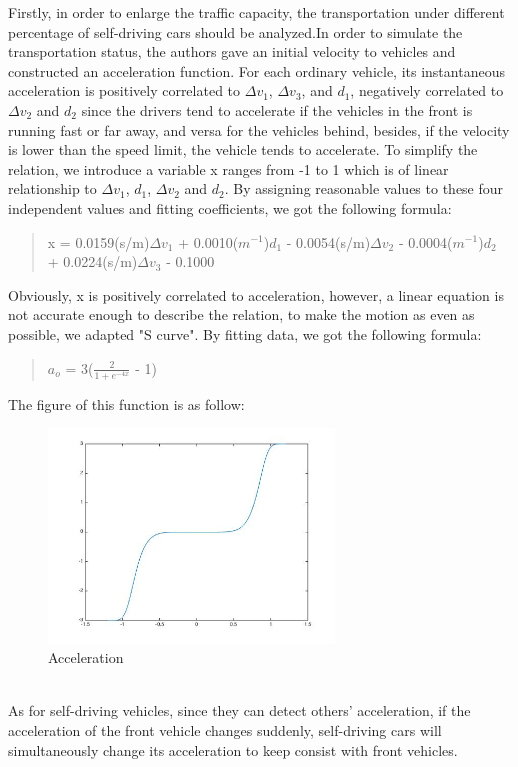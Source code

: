 \documentclass{icmmcm}
\begin{document}
Firstly, in order to enlarge the traffic capacity, the transportation under different percentage of self-driving cars should be analyzed.In order to simulate the transportation status, the authors gave an initial velocity to vehicles and constructed an  acceleration function. For each ordinary vehicle, its instantaneous acceleration is positively correlated to $\Delta$$v_{1}$, $\Delta$$v_{3}$, and $d_{1}$, negatively correlated to $\Delta$$v_{2}$ and $d_{2}$ since the drivers tend to accelerate if the vehicles in the front is running fast or far away, and versa for the vehicles behind, besides, if the velocity is lower than the speed limit, the vehicle tends to accelerate. To simplify the relation, we introduce a variable x ranges from -1 to 1 which is of linear relationship to  $\Delta$$v_{1}$,  $d_{1}$, $\Delta$$v_{2}$ and $d_{2}$. By assigning reasonable values to these four independent values and fitting coefficients, we got the following formula:
\begin{quotation}
 x = 0.0159(s/m)$\Delta$$v_{1}$ + 0.0010($m^{-1}$)$d_{1}$ - 0.0054(s/m)$\Delta$$v_{2}$ - 0.0004($m^{-1}$)$d_{2}$ + 0.0224(s/m)$\Delta$$v_{3}$ - 0.1000
\end{quotation}
Obviously, x is positively correlated to acceleration, however, a linear equation is not accurate enough to describe the relation, to make the motion as even as possible, we adapted "S curve". By fitting data, we got the following formula:\\
\begin{quotation}
$a_{o}$ = 3($\frac{2}{1 + e^{-4x}}$ - 1) %
\end{quotation}
The figure of this function is as follow:\\
\begin{figure}[!htp]
\centering
\includegraphics[height=5.7cm]{Acceleration.jpg}
\caption{Acceleration}
\end{figure}
\\
As for self-driving vehicles, since they can detect others' acceleration, if the acceleration of the front vehicle changes suddenly, self-driving cars will simultaneously change its acceleration to keep consist with front vehicles.\\
\end{document}
